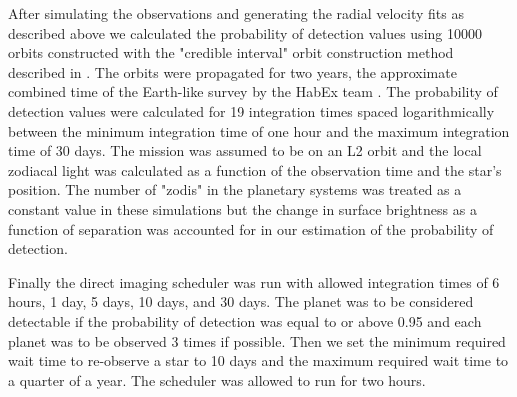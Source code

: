 After simulating the observations and generating the radial velocity fits as
described above we calculated the probability of detection values using 10000
orbits constructed with the "credible interval" orbit construction method
described in . The orbits were propagated for two years,
the approximate combined time of the Earth-like survey by the HabEx team
\citep{gaudiHabitableExoplanetObservatory2020}. The probability of detection
values were calculated for 19 integration times spaced logarithmically between
the minimum integration time of one hour and the maximum integration time of 30
days. The mission was assumed to be on an L2 orbit and the local zodiacal light
was calculated as a function of the observation time and the star's position.
The number of "zodis" in the planetary systems was treated as a constant value
in these simulations but the change in surface brightness as a function of
separation was accounted for in our estimation of the probability of detection.

Finally the direct imaging scheduler was run with allowed integration times
of 6 hours, 1 day, 5 days, 10 days, and 30 days. The planet was to be considered
detectable if the probability of detection was equal to or above 0.95 and each
planet was to be observed 3 times if possible. Then we set the minimum required
wait time to re-observe a star to 10 days and the maximum required wait time to
a quarter of a year. The scheduler was allowed to run for two hours.

